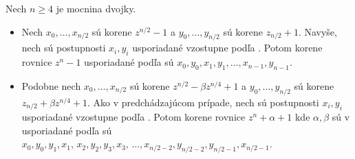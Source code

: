 \begin{lema}
Nech $n\ge4$ je mocnina dvojky.
\begin{itemize}
\item
    Nech $x_0,\dots,x_{n/2}$ sú korene $z^{n/2} -1$ a
    $y_0,\dots,y_{n/2}$ sú korene $z_{n/2}+1$. Navyše, nech sú
    postupnosti $x_i, y_i$ usporiadané vzostupne podľa .
    Potom korene rovnice $z^n -1$ usporiadané podľa  sú
    $x_0,y_0,x_1,y_1,\dots,x_{n-1},y_{n-1}$.
\item
    Podobne nech
    $x_0,\dots,x_{n/2}$ sú korene $z^{n/2} -\beta z^{n/4} +1$ a
    $y_0,\dots,y_{n/2}$ sú korene $z_{n/2} +\beta z^{n/4} +1$. Ako v
    predchádzajúcom prípade, nech sú
    postupnosti $x_i, y_i$ usporiadané vzostupne podľa .
    Potom korene rovnice $z^n +\alpha +1$ kde $\alpha,\beta$ sú v
     usporiadané podľa  sú
    $x_0,y_0,y_1,x_1, \, x_2,y_2,y_3,x_3, \, \dots,
     x_{n/2-2},y_{n/2-2},y_{n/2-1},x_{n/2-1}$.

\end{itemize}
\end{lema}
